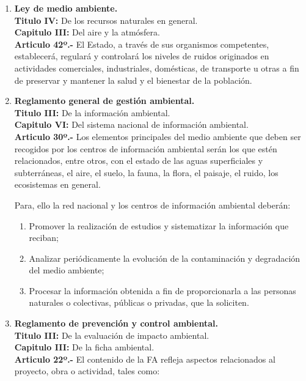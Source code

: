 \documentclass[letter,11pt]{article}
\begin{document}
\begin{enumerate}
\item
\textbf{Ley de medio ambiente.} \\
\textbf{Titulo IV:} De los recursos naturales en general. \\
\textbf{Capitulo III:} Del aire y la atmósfera. \\
\textbf{Articulo 42º.-} El Estado, a través de sus organismos competentes,
establecerá, regulará y controlará los niveles de ruidos originados en
actividades comerciales, industriales, domésticas, de transporte u otras a fin
de preservar y mantener la salud y el bienestar de la población.

\item
\textbf{Reglamento general de gestión ambiental.} \\
\textbf{Titulo III:} De la información ambiental. \\
\textbf{Capitulo VI:} Del sistema nacional de información ambiental. \\
\textbf{Articulo 30º.-} Los elementos principales del medio ambiente que deben
ser recogidos por los centros de información ambiental serán los que estén
relacionados, entre otros, con el estado de las aguas superficiales y
subterráneas, el aire, el suelo, la fauna, la flora, el paisaje, el ruido, los
ecosistemas en general.

Para, ello la red nacional y los centros de información ambiental deberán:

\begin{enumerate}[label=(\alph*)]
\item Promover la realización de estudios y sistematizar la información que
reciban;
\item Analizar periódicamente la evolución de la contaminación y degradación del
medio ambiente;
\item Procesar la información obtenida a fin de proporcionarla a las personas
naturales o colectivas, públicas o privadas, que la soliciten.
\end{enumerate}

\item
\textbf{Reglamento de prevención y control ambiental.} \\
\textbf{Titulo III:} De la evaluación de impacto ambiental. \\
\textbf{Capitulo III:} De la ficha ambiental. \\
\textbf{Articulo 22º.-} El contenido de la FA refleja aspectos relacionados al
proyecto, obra o actividad, tales como:


\end{enumerate}
\end{document}
